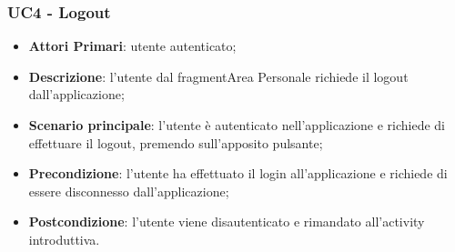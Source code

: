 \subsubsection{UC4 - Logout}
\begin{itemize}
	\item \textbf{Attori Primari}:
	utente autenticato;
	\item \textbf{Descrizione}: l'utente dal fragment\glosp Area Personale richiede il logout dall'applicazione;
	\item \textbf{Scenario principale}: l'utente è autenticato nell'applicazione e richiede di effettuare il logout, premendo sull'apposito pulsante;
	\item \textbf{Precondizione}: l'utente ha effettuato il login all'applicazione e richiede di essere disconnesso dall'applicazione;
	\item \textbf{Postcondizione}: l'utente viene disautenticato e rimandato all'activity introduttiva. 
\end{itemize}

